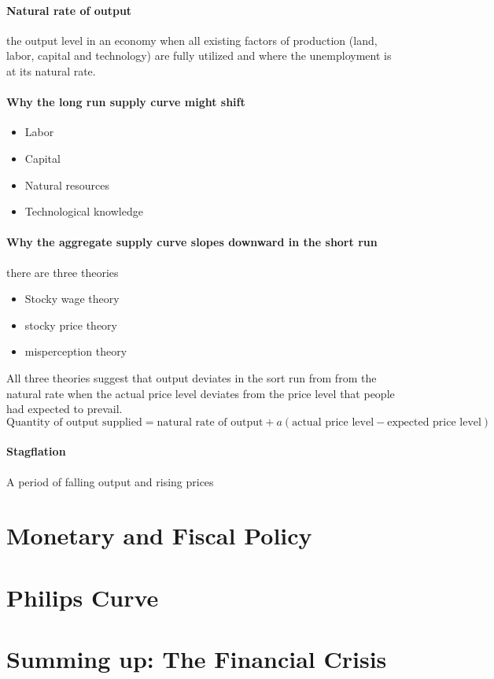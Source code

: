 \documentclass[a4paper,titlepage] {scrartcl}
\begin{document}
\paragraph{Natural rate of output} %
\label{par:natural_rate_of_output}
the output level in an economy when all existing factors of production (land, labor, capital and technology) are fully utilized and where the unemployment is at its natural rate.

\paragraph{Why the long run supply curve might shift} %
\label{par:why_the_long_run_supply_curve_might_shift}
\begin{itemize}
	\item Labor
	\item Capital
	\item Natural resources
	\item Technological knowledge
\end{itemize}



\paragraph{Why the aggregate supply curve slopes downward in the short run} %
\label{par:why_the_aggregate_supply_curve}
there are three theories
\begin{itemize}
	\item Stocky wage theory
	\item stocky price theory
	\item misperception theory
\end{itemize}
All three theories suggest that output deviates in the sort run from from the natural rate when the actual price level deviates from the price level that people had expected to prevail.
\begin{equation}
	\text{Quantity of output supplied} = \text{natural rate of output} + a\left(\text{actual price level} - \text{expected price level}\right)
\end{equation}

\paragraph{Stagflation} %
\label{par:stagflation}
A period of falling output and rising prices

\section{Monetary and Fiscal Policy}

\section{Philips Curve}

\section{Summing up: The Financial Crisis}
\end{document}
